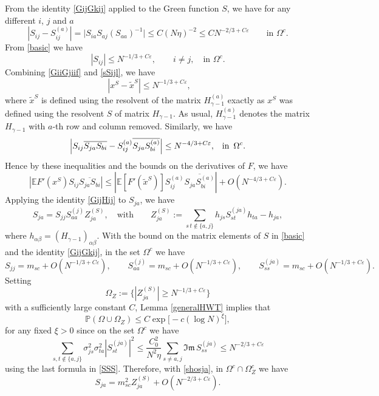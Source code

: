 \documentclass[draft]{article}
\newcommand{\wt}{\widetilde}
\newcommand{\e}{\varepsilon}
\newcommand{\al}{\alpha}
\newcommand{\be}{\begin{equation}}
\newcommand{\ee}{\end{equation}}
\newcommand{\im}{{\mathfrak{Im} \, }}
\newcommand{\E}{{\mathbb E }}
\renewcommand{\P}{{\mathbb P}}
\numberwithin{equation}{section}
\numberwithin{theorem}{section}
\numberwithin{definition}{section}
\numberwithin{remark}{section}
\begin{document}
From  the identity \eqref{GijGkij} applied to the Green function $S$,
 we have 
for any different $i$, $j$ and $a$ 
\be\label{GiiGjiif}
 |S_{ij}-S^{(a)}_{ij}|=\Big | 
S_{ia}S_{aj}(S_{aa})^{-1}\Big | \le C (N \eta)^{-2} \le CN^{-2/3+C\e}
 \qquad \mbox{in $\Omega^c$}.
\ee
{F}rom \eqref{basic} we have  
\be\label{sSijl}
|S_{ij}|\leq N^{-1/3+C\e}, \qquad i\ne j,\quad \mbox{in $\Omega^c$}.
\ee 
Combining \eqref{GiiGjiif} and \eqref{sSijl}, we have 
\be\label{c5}
|x^{S} - \wt x^S| \le N^{-1/3 + C \e}, \qquad 
\ee 
where $\wt x^S$ is defined using the resolvent of the matrix $H_{\gamma-1}^{(a)}$
exactly as $x^S$ was defined using the resolvent
$S$ of matrix $H_{\gamma - 1}$. As usual, $H_{\gamma-1}^{(a)}$
denotes the matrix $H_{\gamma-1}$ 
with $a$-th  row and column  removed.
Similarly, 
we have 
\be\label{Sbi}
\left|S_{ij}\overline{S_{ja}S_{bi}}-S_{ij}^{(a)}\overline{S_{ja}S_{bi}^{(a)}}\right|
\leq N^{-4/3+C\e}, \,\,\,\,\,{\rm in }\,\,\,\Omega^c.
\ee 
Hence by these inequalities  and the bounds on the derivatives of $F$, we have 
\be\label{632}
|\E F'(x^S)S_{ij}\overline{S_{ja}S_{bi}}|\leq \left|\E [F'(\wt x^S)] 
S_{ij}^{(a)}\overline{S_{ja}S_{bi}^{(a)}}\right|+O\left(N^{-4/3+C\e}\right).
\ee
Applying the identity \eqref{GijHij} to $S_{ja}^{}$, we have 
\be\label{shosja}
S_{ja}=S_{jj}S_{aa}^{(j)}Z_{ja}^{(S)}, \quad \mbox{with}\qquad
Z_{ja}^{(S)}:=\sum_{s\,t\notin\{a,j\}}h_{js}S^{(ja)}_{st}h_{ta}-h_{ja},
\ee
where $h_{\al\beta}=\left(H_{\gamma-1}\right)_{\al\beta}$. 
With the bound on
 the matrix elements of $S$ in \eqref{basic} and the identity \eqref{GijGkij}, 
in the set $\Omega^c$ we have
\be\label{SSS}
S_{jj}=m_{sc}+O(N^{-1/3+C\e}),
\qquad S_{aa}^{(j)}=m_{sc}+O(N^{-1/3+C\e}),\qquad  S_{ss}^{(ja)}=m_{sc}+O(N^{-1/3+C\e}).
\ee
Setting
$$
   \Omega_Z:= \Big\{ |Z_{ja}^{(S)}| \ge N^{-1/3+C\e}\Big\}
$$
with a sufficiently large constant $C$, 
Lemma \ref{generalHWT} implies that
$$
   \P (\Omega\cup\Omega_Z)\le  C\exp{\big[-c(\log N)^\xi\big]},
$$
for any fixed $\xi>0$
since on the set $\Omega^c$ we have
$$
   \sum_{s,t\not\in \{ a, j\} } \sigma_{js}^2\sigma^2_{ta}|S^{(ja)}_{st}|^2
   \le \frac{C_0^2}{N^2\eta}\sum_{s \neq a, j} \im S^{(ja)}_{ss} \le N^{-2/3+C\e} 
$$
using the last formula in \eqref{SSS}.
Therefore, with   \eqref{shosja}, in $\Omega^c\cap \Omega_Z^c$ we have 
 \be\label{SJA}
S_{ja}=m_{sc}^2 Z_{ja}^{(S)}
+O(N^{-2/3+C\e}).
\ee
\end{document}

